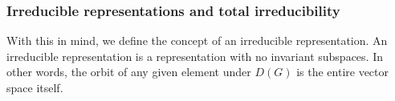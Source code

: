 \subsubsection{Irreducible representations and total irreducibility } 
With this in mind, we define the concept of an irreducible representation. An irreducible representation is a representation with no invariant subspaces. In other words, the orbit of any given element under $D(G) $ is the entire vector space itself. 
